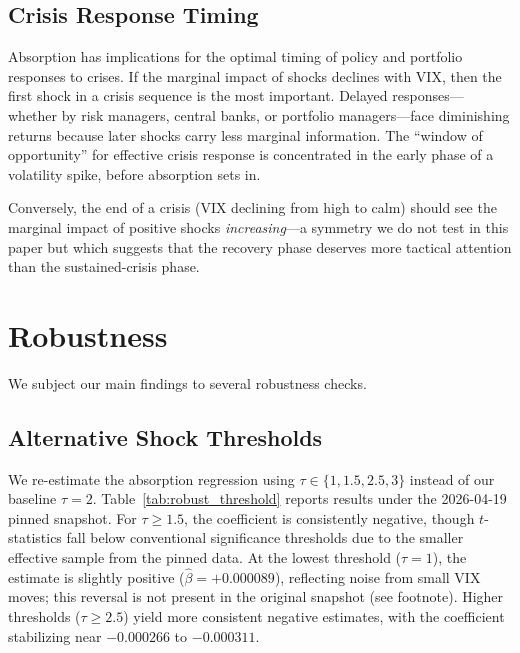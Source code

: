 \documentclass[12pt,a4paper]{article}
\begin{document}
\subsection{Crisis Response Timing}

Absorption has implications for the optimal timing of policy and portfolio responses to crises. If the marginal impact of shocks declines with VIX, then the first shock in a crisis sequence is the most important. Delayed responses---whether by risk managers, central banks, or portfolio managers---face diminishing returns because later shocks carry less marginal information. The ``window of opportunity'' for effective crisis response is concentrated in the early phase of a volatility spike, before absorption sets in.

Conversely, the end of a crisis (VIX declining from high to calm) should see the marginal impact of positive shocks \textit{increasing}---a symmetry we do not test in this paper but which suggests that the recovery phase deserves more tactical attention than the sustained-crisis phase.


\section{Robustness}
\label{sec:robustness}

We subject our main findings to several robustness checks.

\subsection{Alternative Shock Thresholds}

We re-estimate the absorption regression using $\tau \in \{1, 1.5, 2.5, 3\}$ instead of our baseline $\tau = 2$. Table~\ref{tab:robust_threshold} reports results under the 2026-04-19 pinned snapshot. For $\tau \geq 1.5$, the coefficient is consistently negative, though $t$-statistics fall below conventional significance thresholds due to the smaller effective sample from the pinned data. At the lowest threshold ($\tau = 1$), the estimate is slightly positive ($\hat{\beta} = +0.000089$), reflecting noise from small VIX moves; this reversal is not present in the original snapshot (see footnote). Higher thresholds ($\tau \geq 2.5$) yield more consistent negative estimates, with the coefficient stabilizing near $-0.000266$ to $-0.000311$.
\end{document}
